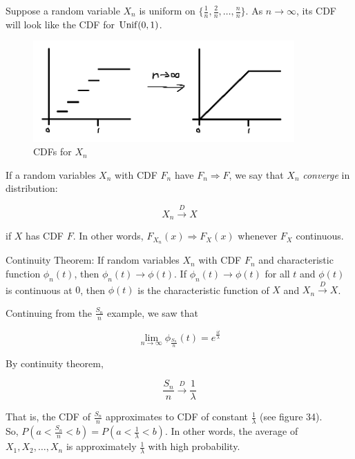 \begin{texample}
	Suppose a random variable $X_n$ is uniform on $\{\frac1n, \frac2n, \dots, \frac{n}{n}\}$. As $n\to\infty$, its CDF will look like the CDF for $\operatorname{Unif}(0, 1)$.
	
	\begin{figure}[H]
		\centering
		\includegraphics[width=100mm]{33.png}
		\caption{CDFs for $X_n$}
	\end{figure}
\end{texample}

If a random variables $X_n$ with CDF $F_n$ have $F_n\Rightarrow F$, we say that $X_n$ \textit{converge} in distribution:

\[X_n\xrightarrow{D}X\]

if $X$ has CDF $F$. In other words, $F_{X_n}(x)\Rightarrow F_X(x)$ whenever $F_X$ continuous.

\begin{theorem}
	Continuity Theorem: If random variables $X_n$ with CDF $F_n$ and characteristic function $\phi_n(t)$, then $\phi_n(t)\to\phi(t)$. If $\phi_n(t)\to\phi(t)$ for all $t$ and $\phi(t)$ is continuous at $0$, then $\phi(t)$ is the characteristic function of $X$ and $X_n\xrightarrow{D}X$.
\end{theorem}

\begin{texample}
	Continuing from the $\frac{S_n}{n}$ example, we saw that
	
	\[\lim_{n\to\infty} \phi_{\frac{S_n}{n}}(t)=e^{\frac{it}{\lambda}}\]
	
	By continuity theorem,
	
	\[\frac{S_n}{n}\xrightarrow{D}\frac{1}{\lambda}\]
	
	That is, the CDF of $\frac{S_n}{n}$ approximates to CDF of constant $\frac{1}{\lambda}$ (see figure 34). \\
	
	So, $P(a<\frac{S_n}{n}<b)=P(a<\frac{1}{\lambda}<b)$. In other words, the average of $X_1, X_2, \dots, X_n$ is approximately $\frac{1}{\lambda}$ with high probability.
\end{texample}

